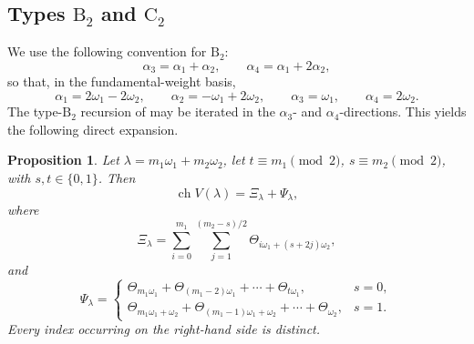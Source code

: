 \documentclass[11pt]{article}
\newtheorem{proposition}[proposition]{Proposition}
\theoremstyle{definition}
\theoremstyle{remark}
\newcommand{\chr}{\operatorname{ch}}
\newcommand{\typeB}{\ensuremath{\mathrm{B}}}
\newcommand{\typeC}{\ensuremath{\mathrm{C}}}
\begin{document}
\subsection{Types $\typeB_2$ and $\typeC_2$}

We use the following convention for $\typeB_2$:
\[
 \alpha_3=\alpha_1+\alpha_2,\qquad
 \alpha_4=\alpha_1+2\alpha_2,
\]
so that, in the fundamental-weight basis,
\[
 \alpha_1=2\omega_1-2\omega_2,\qquad
 \alpha_2=-\omega_1+2\omega_2,\qquad
 \alpha_3=\omega_1,\qquad
 \alpha_4=2\omega_2.
\]
The type-$\typeB_2$ recursion of \cite{Schutzer} may be iterated in the
$\alpha_3$- and $\alpha_4$-directions.  This yields the following direct
expansion.

\begin{proposition}\label{prop:B2-direct}
Let $\lambda=m_1\omega_1+m_2\omega_2$, let
$t\equiv m_1\pmod 2$, $s\equiv m_2\pmod 2$, with $s,t\in\{0,1\}$.  Then
\begin{equation}\label{eq:B2-direct-expansion}
 \chr V(\lambda)=\Xi_\lambda+\Psi_\lambda,
\end{equation}
where
\begin{equation}\label{eq:B2-Xi}
 \Xi_\lambda=
 \sum_{i=0}^{m_1}\sum_{j=1}^{(m_2-s)/2}
       \Theta_{i\omega_1+(s+2j)\omega_2},
\end{equation}
and
\begin{equation}\label{eq:B2-Psi}
 \Psi_\lambda=
 \begin{cases}
  \Theta_{m_1\omega_1}+\Theta_{(m_1-2)\omega_1}+\cdots+
       \Theta_{t\omega_1},&s=0,\\[1mm]
  \Theta_{m_1\omega_1+\omega_2}+\Theta_{(m_1-1)\omega_1+\omega_2}
       +\cdots+\Theta_{\omega_2},&s=1.
 \end{cases}
\end{equation}
Every index occurring on the right-hand side is distinct.
\end{proposition}
\end{document}
